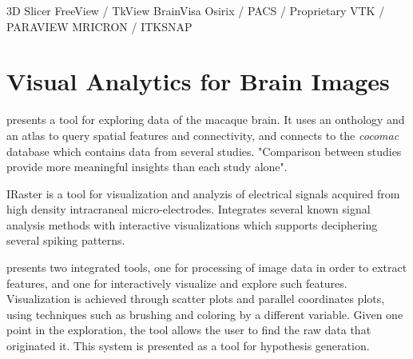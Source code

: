 3D Slicer
FreeView / TkView
BrainVisa
Osirix / PACS / Proprietary
VTK / PARAVIEW
MRICRON / ITKSNAP









\section{Visual Analytics for Brain Images}

\autocite{bezgin_matching_2009} presents a tool for exploring data of the macaque brain. It uses an onthology and an atlas to query spatial features and connectivity, and connects to the \emph{cocomac} database which contains data from several studies. "Comparison between studies provide more meaningful insights than each study alone".

IRaster \autocite{somerville_iraster:_2010}  is a tool for visualization and analyzis of electrical signals acquired from high density intracraneal micro-electrodes. Integrates several known signal analysis methods with interactive visualizations which supports deciphering several spiking patterns.

\autocite{steenwijk_integrated_2010} presents two integrated tools, one for processing of image data in order to extract features, and one for interactively visualize and explore such features. Visualization is achieved through scatter plots and parallel coordinates plots, using techniques such as brushing and coloring by a different variable.  Given one point in the exploration, the tool allows the user to find the raw data that originated it. This system is presented as a tool for hypothesis generation. 

